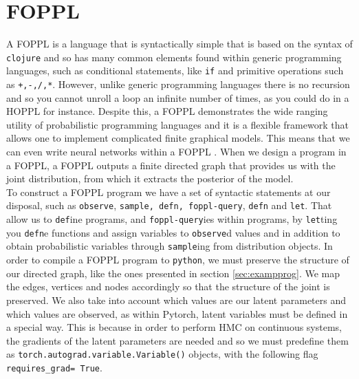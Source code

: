 \documentclass[twoside]{article}
\begin{document}
\section{FOPPL}
\label{sec:foppl}
A FOPPL\citep{woodgroup2017} is a language that is syntactically simple that is based on the syntax of \texttt{clojure}\cite{Hickey2008} and so has many common elements found within generic programming languages, such as conditional statements, like \texttt{if} and primitive operations such as \texttt{+,-,/,*}. However, unlike generic programming languages there is no recursion and so you cannot unroll a loop an infinite number of times, as you could do in a HOPPL for instance. Despite this, a FOPPL demonstrates the wide ranging utility of probabilistic programming languages and it is a flexible framework that allows one to implement complicated finite graphical models. This means that we can even write neural networks within a FOPPL \citep{woodgroup2017}. When we design a program in a FOPPL, a FOPPL outputs a finite directed graph that provides us with the joint distribution, from which it extracts the posterior of the model.\\
To construct a FOPPL program we have a set of syntactic statements at our disposal, such as \texttt{observe}, \texttt{sample, defn, foppl-query}, \texttt{defn} and \texttt{let}. That allow us to \texttt{def}ine programs, and \texttt{foppl-query}ies within programs,  by \texttt{let}ting you \texttt{defn}e functions and assign variables to \texttt{observe}d values and in addition to obtain probabilistic variables through \texttt{sample}ing from distribution objects. In order to compile a FOPPL program to \texttt{python}, we must preserve the structure of our directed graph, like the ones presented in section \ref{sec:exampprog}.  We map the edges, vertices and nodes accordingly so that the structure of the joint is preserved. We also take into account which values are our latent parameters and which values are observed, as within Pytorch, latent variables must be defined in a special way. This is because in order to perform HMC on continuous systems, the gradients of the latent parameters are needed and so we must predefine them as  \texttt{torch.autograd.variable.Variable()} objects, with the following flag \texttt{requires_grad= True}.\\
\end{document}

